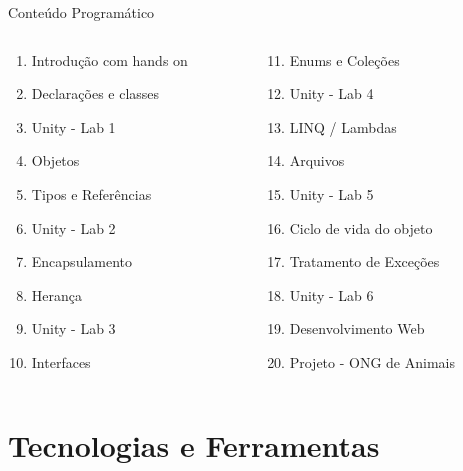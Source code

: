 \documentclass[aspectratio=169]{beamer}
\begin{document}
\begin{frame}{Conteúdo Programático}
\begin{columns}
\begin{column}{0.5\textwidth}
\begin{enumerate}
    \item Introdução com hands on
    \item Declarações e classes
    \item Unity - Lab 1
    \item Objetos
    \item Tipos e Referências
    \item Unity - Lab 2
    \item Encapsulamento
    \item Herança
    \item Unity - Lab 3
    \item Interfaces
\end{enumerate}
\end{column}
\begin{column}{0.5\textwidth}
\begin{enumerate}
    \setcounter{enumi}{10}
    \item Enums e Coleções
    \item Unity - Lab 4
    \item LINQ / Lambdas
    \item Arquivos
    \item Unity - Lab 5
    \item Ciclo de vida do objeto
    \item Tratamento de Exceções
    \item Unity - Lab 6
    \item Desenvolvimento Web
    \item Projeto - ONG de Animais
\end{enumerate}
\end{column}
\end{columns}
\end{frame}

\section{Tecnologias e Ferramentas}
\end{document}
